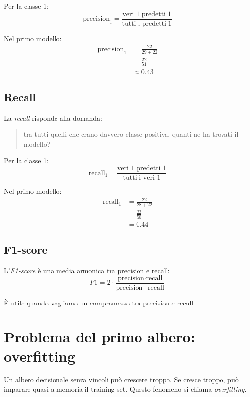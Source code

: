 \documentclass[11pt,a4paper]{article}
\begin{document}
Per la classe 1:
\begin{equation}
    \text{precision}_1 = \frac{\text{veri 1 predetti 1}}{\text{tutti i predetti 1}}
\end{equation}

Nel primo modello:
\begin{align*}
    \text{precision}_1 &= \frac{22}{29 + 22} \\
                       &= \frac{22}{51} \\
                       &\approx 0.43
\end{align*}

\subsection{Recall}
La \textit{recall} risponde alla domanda:
\begin{quote}
    tra tutti quelli che erano davvero classe positiva, quanti ne ha trovati il modello?
\end{quote}

Per la classe 1:
\begin{equation}
    \text{recall}_1 = \frac{\text{veri 1 predetti 1}}{\text{tutti i veri 1}}
\end{equation}

Nel primo modello:
\begin{align*}
    \text{recall}_1 &= \frac{22}{28 + 22} \\
                    &= \frac{22}{50} \\
                    &= 0.44
\end{align*}

\subsection{F1-score}
L'\textit{F1-score} è una media armonica tra precision e recall:
\begin{equation}
    F1 = 2 \cdot \frac{\text{precision} \cdot \text{recall}}{\text{precision} + \text{recall}}
\end{equation}

È utile quando vogliamo un compromesso tra precision e recall.

\section{Problema del primo albero: overfitting}
Un albero decisionale senza vincoli può crescere troppo. Se cresce troppo, può imparare quasi a memoria il training set. Questo fenomeno si chiama \textit{overfitting}.
\end{document}
